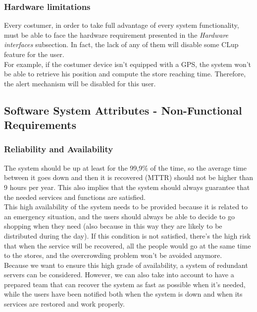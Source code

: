 \documentclass[]{article}
\begin{document}
		\subsubsection{Hardware limitations}
		Every costumer, in order to take full advantage of every system functionality, must be able to face the hardware requirement presented in the \textit{Hardware interfaces} subsection. In fact, the lack of any of them will disable some CLup feature for the user. \\
		For example, if the costumer device isn't equipped with a GPS, the system won't be able to retrieve his position and compute the store reaching time. Therefore, the alert mechanism will be disabled for this user.
		
	
		\bigskip\bigskip

		 
		\subsection{Software System Attributes - Non-Functional Requirements}
			\subsubsection{Reliability and Availability}
			
			The  system should be up at least for the 99,9\% of the time, so the average time between it goes down and then it is recovered (MTTR) should not be higher than 9 hours per year. This also implies that the system should always guarantee that the needed services and functions are satisfied.\\
This high availability of the system needs to be provided because it is related to an emergency situation, and the users should always be able to decide to go shopping when they need (also because in this way they are likely to be distributed during the day). If this condition is not satisfied, there’s the high risk that when the service will be recovered,  all the people would go at the same time to the stores, and the overcrowding problem won’t be avoided anymore.\\
Because we want to ensure this high grade of availability, a system of redundant servers can be considered. However, we can also take into account to have a prepared team that can recover the system as fast as possible when it’s needed, while the users have been notified both when the system is down and when its services are restored and work properly.\\
\end{document}
